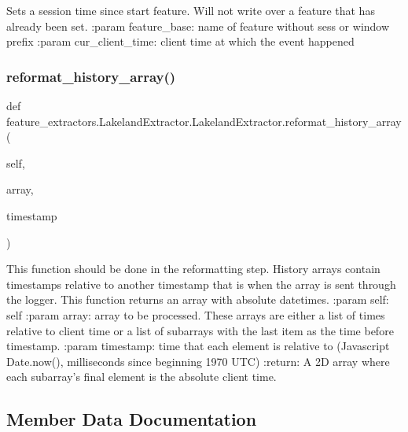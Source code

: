 \begin{DoxyVerb}Sets a session time since start feature. Will not write over a feature that has already been set.
:param feature_base: name of feature without sess or window prefix
:param cur_client_time: client time at which the event happened
\end{DoxyVerb}
 \mbox{\label{classfeature__extractors_1_1_lakeland_extractor_1_1_lakeland_extractor_a8cbbd4e53b43a675d378f330e24db86c}} 
\subsubsection{\texorpdfstring{reformat\_history\_array()}{reformat\_history\_array()}}
{\footnotesize\ttfamily def feature\+\_\+extractors.\+Lakeland\+Extractor.\+Lakeland\+Extractor.\+reformat\+\_\+history\+\_\+array (\begin{DoxyParamCaption}\item[{}]{self,  }\item[{}]{array,  }\item[{}]{timestamp }\end{DoxyParamCaption})}

\begin{DoxyVerb}This function should be done in the reformatting step. History arrays contain timestamps relative to another
timestamp that is when the array is sent through the logger. This function returns an array with absolute
datetimes.
:param self: self
:param array: array to be processed. These arrays are either a list of times relative to client time or a list
of subarrays with the last item as the time before timestamp.
:param timestamp: time that each element is relative to (Javascript Date.now(), milliseconds since beginning 1970 UTC)
:return: A 2D array where each subarray's final element is the absolute client time.
\end{DoxyVerb}
 

\subsection{Member Data Documentation}
\mbox{\label{classfeature__extractors_1_1_lakeland_extractor_1_1_lakeland_extractor_a568671b7a01b23730042e462330de0e2}} 
